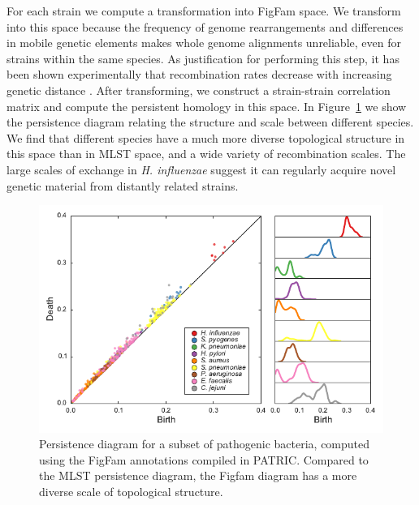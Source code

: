 For each strain we compute a transformation into FigFam space.
We transform into this space because the frequency of genome rearrangements and differences in mobile genetic elements makes whole genome alignments unreliable, even for strains within the same species.
As justification for performing this step, it has been shown experimentally that recombination rates decrease with increasing genetic distance \cite{Fraser:2007ep}.
After transforming, we construct a strain-strain correlation matrix and compute the persistent homology in this space.
In Figure~\ref{fig:figfam_persistence_diagram} we show the persistence diagram relating the structure and scale between different species.
We find that different species have a much more diverse topological structure in this space than in MLST space, and a wide variety of recombination scales.
The large scales of exchange in \emph{H. influenzae} suggest it can regularly acquire novel genetic material from distantly related strains.

\begin{figure}
\centering
\includegraphics[width=\textwidth]{./fig/figfam_persistent_diagram.pdf}
\caption[Genome-wide reticulation patterns in pathogenic bacteria from protein annotations]{Persistence diagram for a subset of pathogenic bacteria, computed using the FigFam annotations compiled in PATRIC. Compared to the MLST persistence diagram, the Figfam diagram has a more diverse scale of topological structure.}
\label{fig:figfam_persistence_diagram}
\end{figure}


